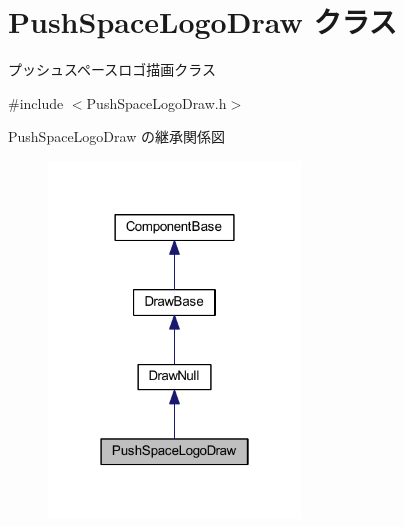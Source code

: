 \hypertarget{class_push_space_logo_draw}{}\section{Push\+Space\+Logo\+Draw クラス}
\label{class_push_space_logo_draw}


プッシュスペースロゴ描画クラス  




{\ttfamily \#include $<$Push\+Space\+Logo\+Draw.\+h$>$}



Push\+Space\+Logo\+Draw の継承関係図\nopagebreak
\begin{figure}[H]
\begin{center}
\leavevmode
\includegraphics[width=190pt]{class_push_space_logo_draw__inherit__graph}
\end{center}
\end{figure}
